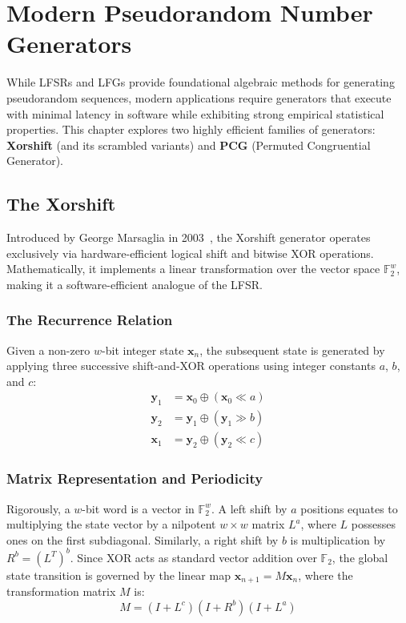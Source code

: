 \section{Modern Pseudorandom Number Generators}

While LFSRs and LFGs provide foundational algebraic methods for generating pseudorandom sequences, modern applications require generators that execute with minimal latency in software while exhibiting strong empirical statistical properties. This chapter explores two highly efficient families of generators: \textbf{Xorshift} (and its scrambled variants) and \textbf{PCG} (Permuted Congruential Generator).

\subsection{The Xorshift}

Introduced by George Marsaglia in 2003~\cite{marsaglia2003xorshift}, the Xorshift generator operates exclusively via hardware-efficient logical shift and bitwise XOR operations. Mathematically, it implements a linear transformation over the vector space $\mathbb{F}_2^w$, making it a software-efficient analogue of the LFSR.

\subsubsection{The Recurrence Relation}


Given a non-zero $w$-bit integer state $\mathbf{x}_n$, the subsequent state is generated by applying three successive shift-and-XOR operations using integer constants $a$, $b$, and $c$:
\begin{align*}
    \mathbf{y}_1 &= \mathbf{x}_0 \oplus (\mathbf{x}_0 \ll a) \\
    \mathbf{y}_2 &= \mathbf{y}_1 \oplus (\mathbf{y}_1 \gg b) \\
    \mathbf{x}_1 &= \mathbf{y}_2 \oplus (\mathbf{y}_2 \ll c)
\end{align*}


\subsubsection{Matrix Representation and Periodicity}
Rigorously, a $w$-bit word is a vector in $\mathbb{F}_2^w$. A left shift by $a$ positions equates to multiplying the state vector by a nilpotent $w \times w$ matrix $L^a$, where $L$ possesses ones on the first subdiagonal. Similarly, a right shift by $b$ is multiplication by $R^b = (L^T)^b$. Since XOR acts as standard vector addition over $\mathbb{F}_2$, the global state transition is governed by the linear map $\mathbf{x}_{n+1} = M\mathbf{x}_n$, where the transformation matrix $M$ is:
$$
M = (I + L^c)(I + R^b)(I + L^a)
$$


